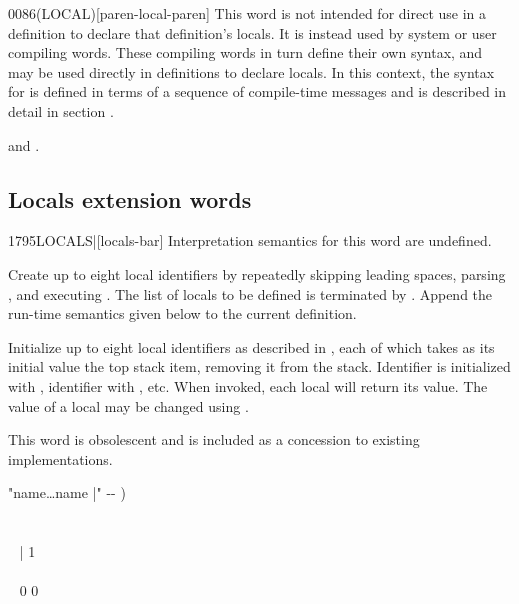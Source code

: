 \begin{worddef}[LOCAL]{0086}{(LOCAL)}[paren-local-paren]
\note
	This word is not intended for direct use in a definition to
	declare that definition's locals. It is instead used by system
	or user compiling words. These compiling words in turn define
	their own syntax, and may be used directly in definitions to
	declare locals. In this context, the syntax for 
	is defined in terms of a sequence of compile-time messages and
	is described in detail in section .

\see {} and
	.
\end{worddef}


\subsection{Locals extension words} %
\extended

\begin{worddef}[LOCALS]{1795}{LOCALS|}[locals-bar]
\interpret
	Interpretation semantics for this word are undefined.

\compile

	Create up to eight local identifiers by repeatedly skipping
	leading spaces, parsing , and executing
	. The list of locals to be defined
	is terminated by \param{|}. Append the run-time semantics given
	below to the current definition.

\runtime

	Initialize up to eight local identifiers as described in
	, each of which takes as its
	initial value the top stack item, removing it from the stack.
	Identifier  is initialized with ,
	identifier  with , etc. When invoked,
	each local will return its value. The value of a local may be
	changed using .

\note This word is obsolescent and is included as a concession to
	existing implementations.

	\begin{implement}
	\word{:}   "name{\ldots}name |" -{}- ) \\
	\tab {} \\
	\tab~   ~    \\
	\tab~ \word{[CHAR]} | \word{-}  1 \word{-}  ~  \\
	\tab~  \\
	\tab {}  ~ 0 0  \\
	\word{;} 
	\end{implement}

\end{worddef}

